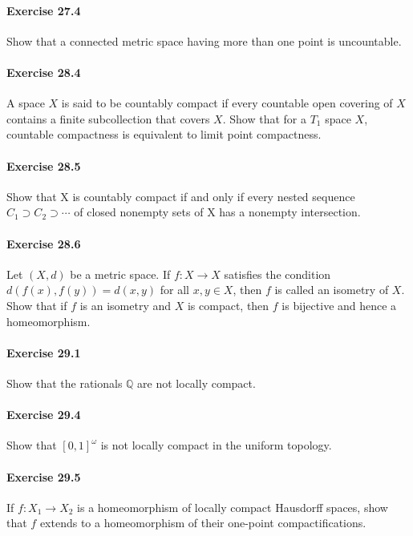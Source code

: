 \documentclass{article}
\begin{document}
\paragraph{Exercise 27.4} Show that a connected metric space having more than one point is uncountable.

\paragraph{Exercise 28.4} A space $X$ is said to be countably compact if every countable open covering of $X$ contains a finite subcollection that covers $X$. Show that for a $T_1$ space $X$, countable compactness is equivalent to limit point compactness.

\paragraph{Exercise 28.5} Show that X is countably compact if and only if every nested sequence $C_1 \supset C_2 \supset \cdots$ of closed nonempty sets of X has a nonempty intersection.

\paragraph{Exercise 28.6} Let $(X, d)$ be a metric space. If $f: X \rightarrow X$ satisfies the condition $d(f(x), f(y))=d(x, y)$ for all $x, y \in X$, then $f$ is called an isometry of $X$. Show that if $f$ is an isometry and $X$ is compact, then $f$ is bijective and hence a homeomorphism.

\paragraph{Exercise 29.1} Show that the rationals $\mathbb{Q}$ are not locally compact.

\paragraph{Exercise 29.4} Show that $[0, 1]^\omega$ is not locally compact in the uniform topology.

\paragraph{Exercise 29.5} If $f \colon X_1 \rightarrow X_2$ is a homeomorphism of locally compact Hausdorff spaces, show that $f$ extends to a homeomorphism of their one-point compactifications.
\end{document}
